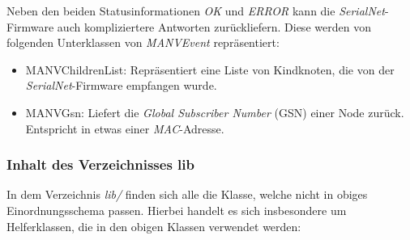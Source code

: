     Neben den beiden Statusinformationen \emph{OK} und \emph{ERROR} kann die \emph{SerialNet}-Firmware auch 
    kompliziertere Antworten zurückliefern. Diese werden von folgenden Unterklassen von \emph{MANVEvent} repräsentiert:
        
    \begin{itemize}
        \item{MANVChildrenList:} Repräsentiert eine Liste von Kindknoten, die von der \emph{SerialNet}-Firmware 
                                 empfangen wurde.
        \item{MANVGsn:} Liefert die \emph{Global Subscriber Number} (GSN) einer Node zurück. Entspricht in etwas einer 
                        \emph{MAC}-Adresse.
    \end{itemize}

    \subsubsection{Inhalt des Verzeichnisses lib}

    In dem Verzeichnis \emph{lib/} finden sich alle die Klasse, welche nicht in obiges Einordnungsschema passen. 
    Hierbei handelt es sich insbesondere um Helferklassen, die in den obigen Klassen verwendet werden:

